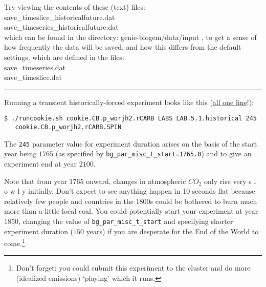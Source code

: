 Try viewing the contents of these (text) files:
\vspace{2pt}
\\ \footnotesize\textsf{save\_timeslice\_historicalfuture.dat }\normalsize
\\ \footnotesize\textsf{save\_timeseries\_historicalfuture.dat }\normalsize
\vspace{2pt}
\\which can be found in the directory: \footnotesize\textsf{genie-biogem/data/input }\normalsize, to get a sense of how frequently the data will be saved, and how this differs from the default settings, which are defined in the files:
\vspace{2pt}
\\ \footnotesize\textsf{save\_timeseries.dat }\normalsize
\\ \footnotesize\textsf{save\_timeslice.dat }\normalsize
\vspace{2pt}

\vspace{1mm}
\noindent\rule{4cm}{0.1mm}
\vspace{2mm}

\noindent Running a transient historically-forced experiment looks like this (\uline{all one line}!):
\vspace{-2pt}\small\begin{verbatim}
$ ./runcookie.sh cookie.CB.p_worjh2.rCARB LABS LAB.5.1.historical 245
   cookie.CB.p_worjh2.rCARB.SPIN
\end{verbatim}\normalsize\vspace{-2pt}
The \texttt{245} parameter value for experiment duration arises on the basis of the start year being \(1765\) (as specified by \texttt{\small bg\_par\_misc\_t\_start=1765.0}) and to give an experiment end at year \(2100\).

\vspace{1mm}

Note that from year 1765 onward, changes in atmospheric \(CO_{2}\) only rise very s l o w l y initially. Don't expect to see anything happen in 10 seconds flat because relatively few people and countries in the 1800s could be bothered to burn much more than a little local coal. You could potentially start your experiment at year 1850, changing the value of \texttt{\small bg\_par\_misc\_t\_start} and specifying shorter experiment duration (\(150\) years) if you are desperate for the End of the World to come.\footnote{Don’t forget: you could submit this experiment to the cluster and do more (idealized emissions) ‘playing’ which it runs.} 

